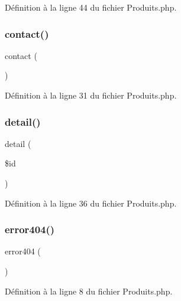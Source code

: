Définition à la ligne 44 du fichier Produits.\+php.

\mbox{\label{class_produits_a9f5d7f60267d2c2712109d4bc2937612}} 
\subsubsection{\texorpdfstring{contact()}{contact()}}
{\footnotesize\ttfamily contact (\begin{DoxyParamCaption}{ }\end{DoxyParamCaption})}



Définition à la ligne 31 du fichier Produits.\+php.

\mbox{\label{class_produits_ae0f8b9d7c69282ded611d8a2a9a43217}} 
\subsubsection{\texorpdfstring{detail()}{detail()}}
{\footnotesize\ttfamily detail (\begin{DoxyParamCaption}\item[{}]{\$id }\end{DoxyParamCaption})}



Définition à la ligne 36 du fichier Produits.\+php.

\mbox{\label{class_produits_a87a4b3da34150d62eb414e41257e59c7}} 
\subsubsection{\texorpdfstring{error404()}{error404()}}
{\footnotesize\ttfamily error404 (\begin{DoxyParamCaption}{ }\end{DoxyParamCaption})}



Définition à la ligne 8 du fichier Produits.\+php.

\mbox{\label{class_produits_aa9d6c9e344104cf118d31bd0d93c3bcf}} 
